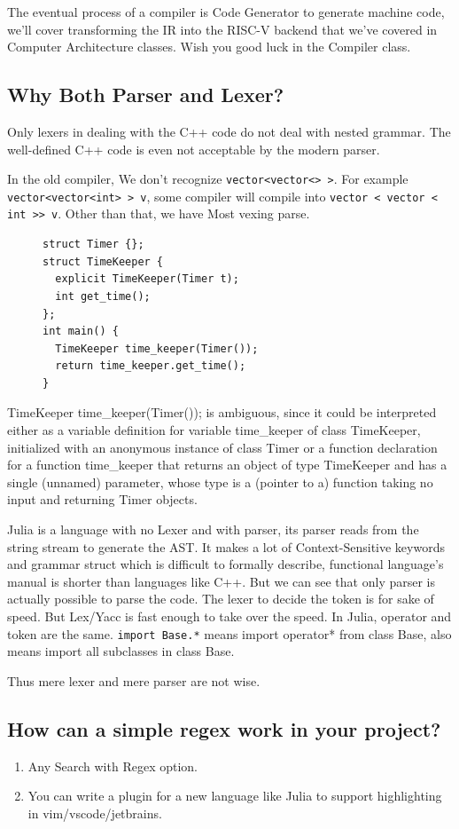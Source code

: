 \documentclass[a4paper]{exam}
\newcommand{\code}[1]{\texttt{#1}}
\begin{document}
The eventual process of a compiler is Code Generator to generate machine code, we'll cover transforming the IR into the RISC-V backend that we've covered in Computer Architecture classes. Wish you good luck in the Compiler class.

\subsection{Why Both Parser and Lexer?}
Only lexers in dealing with the C++ code do not deal with nested grammar. The well-defined C++ code is even not acceptable by the modern parser.

In the old compiler, We don't recognize \code{vector<vector<> >}. For example \code{vector<vector<int> > v}, some compiler will compile into \code{vector < vector < int >> v}. Other than that, we have Most vexing parse.

\begin{figure}[H]
  \begin{verbatim}
struct Timer {};
struct TimeKeeper {
  explicit TimeKeeper(Timer t);
  int get_time();
};
int main() {
  TimeKeeper time_keeper(Timer());
  return time_keeper.get_time();
}
    \end{verbatim}
\end{figure}

TimeKeeper time\_keeper(Timer()); is ambiguous, since it could be interpreted either as a variable definition for variable time\_keeper of class TimeKeeper, initialized with an anonymous instance of class Timer or a function declaration for a function time\_keeper that returns an object of type TimeKeeper and has a single (unnamed) parameter, whose type is a (pointer to a) function taking no input and returning Timer objects. \cite{mvp}

Julia is a language with no Lexer and with parser, its parser reads from the string stream to generate the AST. It makes a lot of Context-Sensitive keywords and grammar struct which is difficult to formally describe, functional language's manual is shorter than languages like C++. But we can see that only parser is actually possible to parse the code. The lexer to decide the token is for sake of speed. But Lex/Yacc is fast enough to take over the speed. In Julia, operator and token are the same. \code{import Base.*} means import operator* from class Base, also means import all subclasses in class Base.

Thus mere lexer and mere parser are not wise.
\subsection{How can a simple regex work in your project?}
\begin{enumerate}
  \item Any Search with Regex option.
  \item You can write a plugin for a new language like Julia to support highlighting in vim/vscode/jetbrains.
\end{enumerate}
\end{document}
